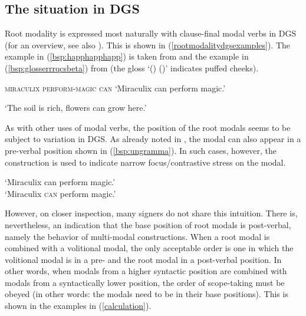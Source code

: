 \subsection{The situation in DGS}
\noindent Root modality is expressed most naturally with clause-final modal verbs in DGS (for an overview, see also \citealt{pfauquer2007syntaxofnegationandmodals}). This is shown in (\ref{rootmodalitydgsexamples}). The example in (\ref{bsp:happhapphapp}) is taken from \citet[359]{happ2014vork} and the example in (\ref{bsp:glosserrrqcsbeta}) from \citet[23]{bross2017scope} (the gloss `() ()' indicates puffed cheeks).

\begin{exe}
\ex\label{rootmodalitydgsexamples}\begin{xlist}
\ex\label{bsp:happhapphapp}
{}   
{\textsc{miraculix perform-magic can}}    
\glt `Miraculix can perform magic.' 

\ex\label{bsp:glosserrrqcsbeta}
  
\glt `The soil is rich, flowers can grow here.' 
\end{xlist}
\end{exe}

\noindent As with other uses of modal verbs, the position of the root modals seems to be subject to variation in DGS. As already noted in \citet[23]{bross2017scope}, the modal can also appear in a pre-verbal position shown in (\ref{bsp:ungramma}). In such cases, however, the construction is used to indicate narrow focus/contrastive stress on the modal.

\begin{exe}
   \label{bsp:ungramma} 
\glt *\phantom{\cmark} `Miraculix can perform magic.' \\
\cmark\phantom{*} `Miraculix \textsc{can} perform magic.'
\end{exe}

\largerpage
\noindent However, on closer inspection, many signers do not share this intuition. There is, nevertheless, an indication that the base position of root modals is post-verbal, namely the behavior of multi-modal constructions. When a root modal is combined with a volitional modal, the only acceptable order is one in which the volitional modal is in a pre- and the root modal in a post-verbal position. In other words, when modals from a higher syntactic position are combined with modals from a syntactically lower position, the order of scope-taking must be obeyed (in other words: the modals need to be in their base positions). This is shown in the examples in (\ref{calculation}).

